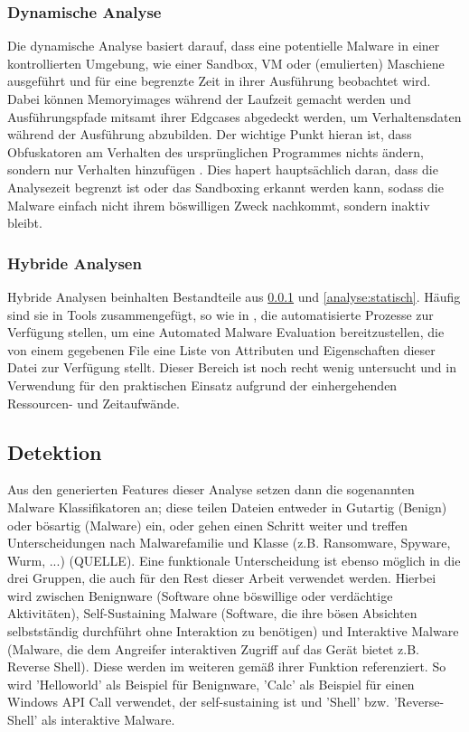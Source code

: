 \subsubsection{Dynamische Analyse}
\label{analyse:dynamisch}
Die dynamische Analyse basiert darauf, dass eine potentielle Malware in einer kontrollierten Umgebung, wie einer Sandbox, VM oder (emulierten) Maschiene ausgeführt und für eine begrenzte Zeit in ihrer Ausführung beobachtet wird\cite{aboaoja_2023_a}. Dabei können Memoryimages während der Laufzeit gemacht werden und Ausführungspfade mitsamt ihrer Edgcases abgedeckt werden, um Verhaltensdaten während der Ausführung abzubilden. Der wichtige Punkt hieran ist, dass Obfuskatoren am Verhalten des ursprünglichen Programmes nichts ändern, sondern nur Verhalten hinzufügen \cite{alkhateeb_2023_a}. 
Dies hapert hauptsächlich daran, dass die Analysezeit begrenzt ist oder das Sandboxing erkannt werden kann, sodass die Malware einfach nicht ihrem böswilligen Zweck nachkommt, sondern inaktiv bleibt.

\subsubsection{Hybride Analysen}
\label{analyse:hybrid}
Hybride Analysen beinhalten Bestandteile aus \ref{analyse:dynamisch} und \ref{analyse:statisch}. Häufig sind sie in Tools zusammengefügt, so wie in \cite{oreilly_2022_cape}, die automatisierte Prozesse zur Verfügung stellen, um eine Automated Malware Evaluation bereitzustellen, die von einem gegebenen File eine Liste von Attributen und Eigenschaften dieser Datei zur Verfügung stellt. Dieser Bereich ist noch recht wenig untersucht und in Verwendung für den praktischen Einsatz aufgrund der einhergehenden Ressourcen- und Zeitaufwände.

\subsection{Detektion}
Aus den generierten Features dieser Analyse setzen dann die sogenannten Malware Klassifikatoren an; diese teilen Dateien entweder in Gutartig (Benign) oder bösartig (Malware) ein, oder gehen einen Schritt weiter und treffen Unterscheidungen nach Malwarefamilie und Klasse (z.B. Ransomware, Spyware, Wurm, ...) (QUELLE). Eine funktionale Unterscheidung ist ebenso möglich in die drei Gruppen, die auch für den Rest dieser Arbeit verwendet werden. Hierbei wird zwischen Benignware (Software ohne böswillige oder verdächtige Aktivitäten), Self-Sustaining Malware (Software, die ihre bösen Absichten selbstständig durchführt ohne Interaktion zu benötigen) und Interaktive Malware (Malware, die dem Angreifer interaktiven Zugriff auf das Gerät bietet z.B. Reverse Shell). Diese werden im weiteren gemäß ihrer Funktion referenziert. So wird 'Helloworld' als Beispiel für Benignware, 'Calc' als Beispiel für einen Windows API Call verwendet, der self-sustaining ist und 'Shell' bzw. 'Reverse-Shell' als interaktive Malware.

